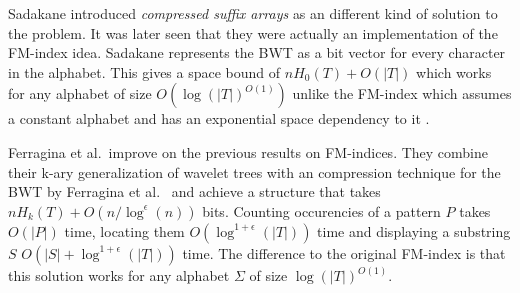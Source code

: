 \documentclass[11pt]{article}
\newcommand{\bigo}{O}
\begin{document}
Sadakane introduced \emph{compressed suffix arrays} \cite{sadakane02}
as an different kind of solution to the problem. It was later seen
that they were actually an implementation of the FM-index idea.
Sadakane represents the BWT as a bit vector for every character in the
alphabet. This gives a space bound of $nH_0(T) + \bigo(|T|)$ which
works for any alphabet of size $\bigo(\log(|T|)^{\bigo(1)})$ unlike
the FM-index which assumes a constant alphabet and has an exponential
space dependency to it \cite{ferragina07}.

Ferragina et al.\ improve \cite{ferragina07} on the previous results
on FM-indices. They combine their k-ary generalization of wavelet
trees with an compression technique for the BWT by Ferragina et al.\
\cite{ferragina05} and achieve a structure that takes $nH_k(T) +
\bigo(n / \log^{\epsilon}(n))$ bits. Counting occurencies of a pattern
$P$ takes $\bigo(|P|)$ time, locating them
$\bigo(\log^{1+\epsilon}(|T|))$ time and displaying a substring $S$
$\bigo(|S| + \log^{1+\epsilon}(|T|))$ time. The difference to the
original FM-index is that this solution works for any alphabet
$\Sigma$ of size $\log(|T|)^{\bigo(1)}$.



\end{document}
